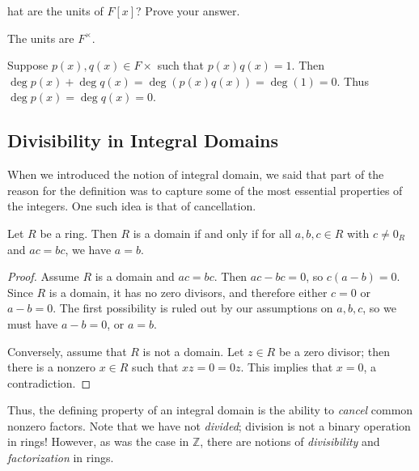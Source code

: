 \documentclass[english,course]{lecture}
\theoremstyle{plain}
\newenvironment{question}[1]
  {\renewcommand\theinnerquestion{#1}\innerquestion}
  {\endinnerquestion}
\def\Z{{\mathbb Z}}
\def\presnotes{}
\begin{document}
\presnotes
	
	
\begin{question}
	What are the units of $F[x]$? Prove your answer.
\end{question}

\begin{answer}
	The units are $F^\times$.
	
	Suppose $p(x),q(x)\in F\times$ such that $p(x) q(x) = 1$.
	Then $\deg p(x) + \deg q(x) = \deg(p(x) q(x)) = \deg(1) = 0$.
	Thus $\deg p(x) = \deg q(x) = 0$.
\end{answer}

\presnotes







\subsection{Divisibility in Integral Domains}\label{SubSec-Divisibility-in-Domains}

When we introduced the notion of integral domain, we said that part of the reason for the definition was to capture some of the most essential properties of the integers.
One such idea is that of cancellation.

\begin{theorem}
	Let $R$ be a ring.
	Then $R$ is a domain if and only if for all $a,b,c\in R$ with $c\ne 0_R$ and $ac = bc$, we have $a = b$.
\end{theorem}


\begin{proof}
	Assume $R$ is a domain and $ac = bc$.
	Then $ac - bc = 0$, so $c(a-b) = 0$.
	Since $R$ is a domain, it has no zero divisors, and therefore either $c = 0$ or $a-b=0$.
	The first possibility is ruled out by our assumptions on $a,b,c$, so we must have $a-b = 0$, or $a =b$.
	
	Conversely, assume that $R$ is not a domain.
	Let $z\in R$ be a zero divisor; then there is a nonzero $x\in R$ such that $xz = 0 = 0 z$.
	This implies that $x = 0$, a contradiction.
\end{proof}

\presnotes

Thus, the defining property of an integral domain is the ability to \emph{cancel} common nonzero factors. 
Note that we have not \emph{divided}; division is not a binary operation in rings!
However, as was the case in $\Z$, there are notions of \emph{divisibility} and \emph{factorization} in rings.
\end{document}
